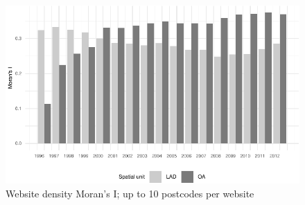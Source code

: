 \documentclass[
  authoryear,
  preprint,
  3p]{elsarticle}
\begin{document}
\begin{figure}[H]

{\centering \includegraphics[width=1\textwidth,height=\textheight]{tranos2023_files/figure-pdf/morani10-1.pdf}

}

\caption{\label{morani10}Website density Moran's I; up to 10 postcodes
per website}

\end{figure}%
\end{document}
